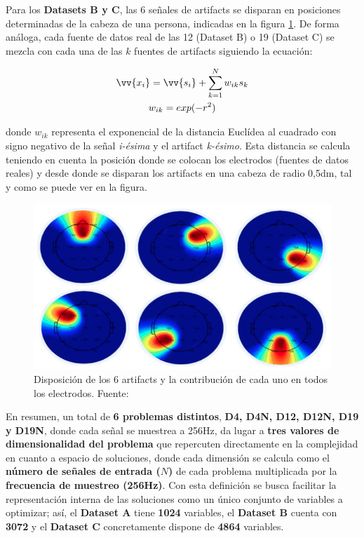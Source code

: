 Para los \textbf{Datasets B y C}, las 6 señales de artifacts se disparan en posiciones determinadas de la cabeza de una persona, indicadas  en la figura \ref{fig:artifactsLocation}. De forma análoga, cada fuente de datos real de las 12 (Dataset B) o 19 (Dataset C) se mezcla con cada una de las $k$ fuentes de artifacts siguiendo la ecuación:

\begin{equation}\label{eq:D12-9}
	\begin{gathered}
	\vv{x_i} = \vv{s_i} + \sum_{k=1}^{N} w_{ik} s_k\\
	w_{ik} = exp (-r^2)
	\end{gathered}
\end{equation}

donde $w_{ik}$ representa el exponencial de la distancia Euclídea al cuadrado con signo negativo de la señal \textit{i-ésima} y el artifact \textit{k-ésimo}. Esta distancia se calcula teniendo en cuenta la posición donde se colocan los electrodos (fuentes de datos reales) y desde donde se disparan los artifacts en una cabeza de radio 0,5dm, tal y como se puede ver en la figura.

\begin{figure}[h]
	\centering
	\includegraphics[scale=0.45]{imagenes/Artifacts}
	\caption{Disposición de los 6 artifacts y la contribución de cada uno en todos los electrodos. Fuente: \cite{EvolutionaryBigOpt}}
	\label{fig:artifactsLocation}
\end{figure}

En resumen, un total de \textbf{6 problemas distintos}, \textbf{D4, D4N, D12, D12N, D19 y D19N}, donde cada señal se muestrea a 256Hz, da lugar a \textbf{tres valores de dimensionalidad del problema} que repercuten directamente en la complejidad en cuanto a espacio de soluciones, donde cada dimensión se calcula como el \textbf{número de señales de entrada ($N$)} de cada problema multiplicada por la \textbf{frecuencia de muestreo (256Hz)}. Con esta definición se busca facilitar la representación interna de las soluciones como un único conjunto de variables a optimizar; así, el \textbf{Dataset A} tiene \textbf{1024} variables, el \textbf{Dataset B} cuenta con \textbf{3072} y el \textbf{Dataset C} concretamente dispone de \textbf{4864} variables.

